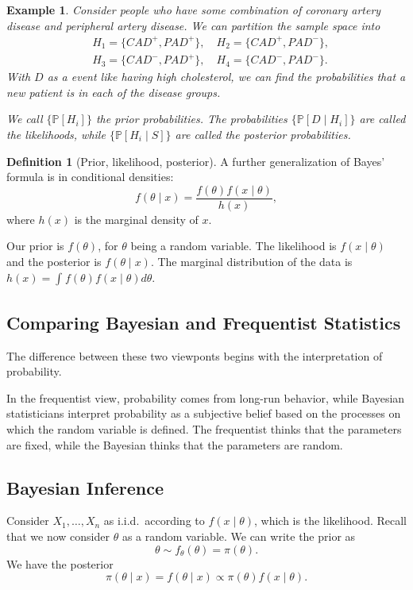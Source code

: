 \documentclass{tufte-handout}
\renewcommand{\P}{\mathbb{P}}
\newtheorem{ex}[thm]{Example}
\theoremstyle{definition}
\newtheorem{defn}[thm]{Definition}
\begin{document}
\begin{ex}
	Consider people who have some combination of coronary artery disease and peripheral artery disease. We can partition the sample space into \begin{align*}
		&H_1 = \{CAD^+, PAD^+\}, \quad H_2 = \{CAD^+, PAD^-\},\\ &H_3 = \{CAD^-, PAD^+\}, \quad H_4 = \{CAD^-, PAD^-\}
	.\end{align*}
	With $D$ as a event like having high cholesterol, we can find the probabilities that a new patient is in each of the disease groups.

	We call $\{\P\left[H_i\right]\}$ the prior probabilities. The probabilities $\{\P\left[D \mid H_i\right] \}$ are called the likelihoods, while $\{\P\left[H_i \mid S\right] \}$ are called the posterior probabilities.
\end{ex}

\begin{defn}[Prior, likelihood, posterior]
	A further generalization of Bayes' formula is in conditional densities: \[
		f(\theta \mid x) = \frac{f(\theta) f(x \mid \theta)}{h(x)}
	,\] where $h(x)$ is the marginal density of $x$.

	Our prior is $f(\theta)$, for $\theta$ being a random variable. The likelihood is $f(x\mid \theta)$ and the posterior is $f(\theta\mid x)$. 
	The marginal distribution of the data is $h(x) = \int_{}^{} f(\theta) f(x \mid \theta) d\theta $.
\end{defn}

\subsection{Comparing Bayesian and Frequentist Statistics}

The difference between these two viewponts begins with the interpretation of probability.

In the frequentist view, probability comes from long-run behavior, while Bayesian statisticians interpret probability as a subjective belief based on the processes on which the random variable is defined. The frequentist thinks that the parameters are fixed, while the Bayesian thinks that the parameters are random.

\subsection{Bayesian Inference}
Consider $X_1,\ldots,X_n$ as i.i.d.\ according to $f(x \mid \theta)$, which is the likelihood.
Recall that we now consider $\theta$ as a random variable. We can write the prior as \[
	\theta \sim  f_\theta(\theta) = \pi(\theta)
.\]
We have the posterior \[
	\pi(\theta\mid x) = f(\theta \mid x) \propto \pi(\theta) f(x\mid \theta)
.\] 
\end{document}
